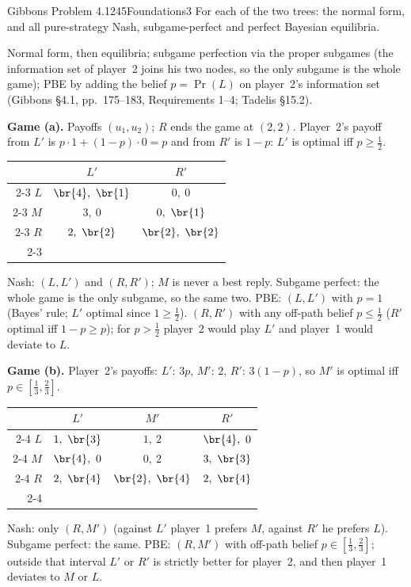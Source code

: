 \begin{exsol}{Gibbons Problem 4.1}{245}{Foundations}{3}
\asked For each of the two trees: the normal form, and all pure-strategy Nash, subgame-perfect and
perfect Bayesian equilibria.

\method Normal form, then equilibria; subgame perfection via the proper subgames (the
information set of player~2 joins his two nodes, so the only subgame is the whole game); PBE by
adding the belief $p = \Pr(L)$ on player~2's information set (Gibbons \S4.1, pp.~175--183,
Requirements 1--4; Tadelis \S15.2).

\solution \textbf{Game (a).} Payoffs $(u_1, u_2)$; $R$ ends the game at $(2,2)$. Player~2's
payoff from $L'$ is $p \cdot 1 + (1-p) \cdot 0 = p$ and from $R'$ is $1 - p$: $L'$ is optimal iff
$p \ge \frac12$.
\begin{center}
\begin{tabular}{r|c|c|}
\multicolumn{1}{r}{} & \multicolumn{1}{c}{$L'$} & \multicolumn{1}{c}{$R'$}\\ \cline{2-3}
$L$ & $\br{4},\ \br{1}$ & $0,\ 0$ \\ \cline{2-3}
$M$ & $3,\ 0$ & $0,\ \br{1}$ \\ \cline{2-3}
$R$ & $2,\ \br{2}$ & $\br{2},\ \br{2}$ \\ \cline{2-3}
\end{tabular}
\end{center}
Nash: $(L, L')$ and $(R, R')$; $M$ is never a best reply. Subgame perfect: the whole game is the
only subgame, so the same two. PBE: $(L, L')$ with $p = 1$ (Bayes' rule; $L'$ optimal since
$1 \ge \frac12$). $(R, R')$ with any off-path belief $p \le \frac12$ ($R'$ optimal iff $1 - p \ge p$);
for $p > \frac12$ player~2 would play $L'$ and player~1 would deviate to $L$.

\textbf{Game (b).} Player~2's payoffs: $L'$: $3p$, $M'$: $2$, $R'$: $3(1-p)$, so $M'$ is optimal iff
$p \in [\frac13, \frac23]$.
\begin{center}
\begin{tabular}{r|c|c|c|}
\multicolumn{1}{r}{} & \multicolumn{1}{c}{$L'$} & \multicolumn{1}{c}{$M'$} & \multicolumn{1}{c}{$R'$}\\ \cline{2-4}
$L$ & $1,\ \br{3}$ & $1,\ 2$ & $\br{4},\ 0$ \\ \cline{2-4}
$M$ & $\br{4},\ 0$ & $0,\ 2$ & $3,\ \br{3}$ \\ \cline{2-4}
$R$ & $2,\ \br{4}$ & $\br{2},\ \br{4}$ & $2,\ \br{4}$ \\ \cline{2-4}
\end{tabular}
\end{center}
Nash: only $(R, M')$ (against $L'$ player~1 prefers $M$, against $R'$ he prefers $L$). Subgame
perfect: the same. PBE: $(R, M')$ with off-path belief $p \in [\frac13, \frac23]$; outside that
interval $L'$ or $R'$ is strictly better for player~2, and then player~1 deviates to $M$ or $L$.


\end{exsol}

